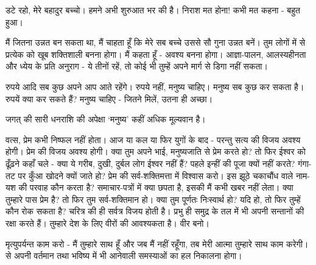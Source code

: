 डटे रहो, मेरे बहादुर बच्चो। हमने अभी शुरुआत भर की है। निराश मत होना! कभी मत कहना - बहुत हुआ। 

मैं जितना उन्नत बन सकता था, मैं चाहता हूँ कि मेरे सब बच्चे उससे सौ गुना उन्नत बनें। तुम लोगों में से प्रत्येक को खूब शक्तिशाली बनना होगा। मैं कहता हूँ - अवश्य बनना होगा। आज्ञा-पालन, आलस्यहीनता और ध्येय के प्रति अनुराग - ये तीनों रहें, तो कोई भी तुम्हें अपने मार्ग से डिगा नहीं सकता। 

रुपये आदि सब कुछ अपने आप आते रहेंगे। रुपये नहीं, मनुष्य चाहिए। मनुष्य सब कुछ कर सकता है। रुपयें क्या कर सकते हैं? मनुष्य चाहिए - जितने मिलें, उतना ही अच्छा। 

जगत् की सारी धनराशि की अपेक्षा ‘मनुष्य’ कहीं अधिक मूल्यवान है। 

वत्स, प्रेम कभी निष्फल नहीं होता। आज या कल या फिर युगों के बाद - परन्तु सत्य की विजय अवश्य होगी। प्रेम की विजय अवश्य होगी। क्या तुम अपने भाई, मनुष्यजाति से प्रेम करते हो? तो फिर ईश्वर को ढूँढ़ने कहाँ चले - क्या ये गरीब, दुखी, दुर्बल लोग ईश्वर नहीं हैं? पहले इन्हीं की पूजा क्यों नहीं करते? गंगा-तट पर कुँआ खोदने क्यों जाते हो? प्रेम की सर्व-शक्तिमत्ता में विश्वास करो। इस झूठे चकाचौंध वाले नाम-यश की परवाह कौन करता है? समाचार-पत्रों में क्या छपता है, इसकी मैं कभी खबर नहीं लेता। क्या तुम्हारे पास प्रेम है? तो फिर तुम सर्व-शक्तिमान हो। क्या तुम पूर्णतः निःस्वार्थ हो? यदि हो, तो फिर तुम्हें कौन रोक सकता है? चरित्र की ही सर्वत्र विजय होती है। प्रभु ही समुद्र के तल में भी अपनी सन्तानों की रक्षा करते हैं। तुम्हारे देश के लिए वीरों की आवश्यकता है। वीर बनो। 

मृत्युपर्यन्त काम करो - मैं तुम्हारे साथ हूँ और जब मैं नहीं रहूँगा, तब मेरी आत्मा तुम्हारे साथ काम करेगी। से अपनी वर्तमान तथा भविष्य में भी आनेवाली समस्याओं का हल निकालना होगा। 

\delimiter

\addtoendnotes{\protect\end{multicols}}

